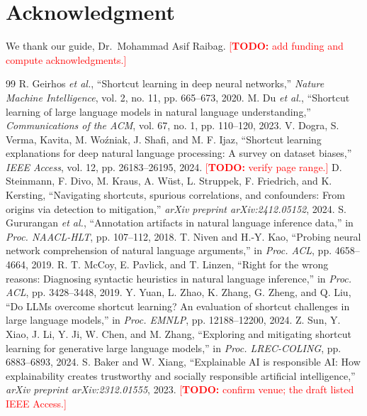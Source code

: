 \documentclass[conference]{IEEEtran}
\newcommand{\TODO}[1]{\textcolor{red}{[\textbf{TODO:} #1]}}
\begin{document}
\section*{Acknowledgment}
We thank our guide, Dr.\ Mohammad Asif Raibag. \TODO{add funding and compute acknowledgments.}

\begin{thebibliography}{99}
 R. Geirhos \textit{et al.}, ``Shortcut learning in deep neural networks,'' \textit{Nature Machine Intelligence}, vol. 2, no. 11, pp. 665--673, 2020.
 M. Du \textit{et al.}, ``Shortcut learning of large language models in natural language understanding,'' \textit{Communications of the ACM}, vol. 67, no. 1, pp. 110--120, 2023.
 V. Dogra, S. Verma, Kavita, M. Wo\'{z}niak, J. Shafi, and M. F. Ijaz, ``Shortcut learning explanations for deep natural language processing: A survey on dataset biases,'' \textit{IEEE Access}, vol. 12, pp. 26183--26195, 2024. \TODO{verify page range.}
 D. Steinmann, F. Divo, M. Kraus, A. W\"{u}st, L. Struppek, F. Friedrich, and K. Kersting, ``Navigating shortcuts, spurious correlations, and confounders: From origins via detection to mitigation,'' \textit{arXiv preprint arXiv:2412.05152}, 2024.
 S. Gururangan \textit{et al.}, ``Annotation artifacts in natural language inference data,'' in \textit{Proc. NAACL-HLT}, pp. 107--112, 2018.
 T. Niven and H.-Y. Kao, ``Probing neural network comprehension of natural language arguments,'' in \textit{Proc. ACL}, pp. 4658--4664, 2019.
 R. T. McCoy, E. Pavlick, and T. Linzen, ``Right for the wrong reasons: Diagnosing syntactic heuristics in natural language inference,'' in \textit{Proc. ACL}, pp. 3428--3448, 2019.
 Y. Yuan, L. Zhao, K. Zhang, G. Zheng, and Q. Liu, ``Do LLMs overcome shortcut learning? An evaluation of shortcut challenges in large language models,'' in \textit{Proc. EMNLP}, pp. 12188--12200, 2024.
 Z. Sun, Y. Xiao, J. Li, Y. Ji, W. Chen, and M. Zhang, ``Exploring and mitigating shortcut learning for generative large language models,'' in \textit{Proc. LREC-COLING}, pp. 6883--6893, 2024.
 S. Baker and W. Xiang, ``Explainable AI is responsible AI: How explainability creates trustworthy and socially responsible artificial intelligence,'' \textit{arXiv preprint arXiv:2312.01555}, 2023. \TODO{confirm venue; the draft listed IEEE Access.}

\end{thebibliography}
\end{document}
